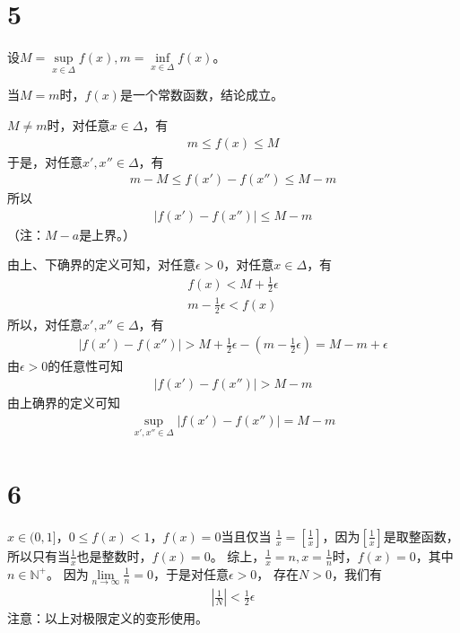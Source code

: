 \documentclass{article}
\begin{document}
\section*{5}

设$M = \sup\limits_{x \in \Delta} f(x), m = \inf\limits_{x \in \Delta} f(x)$。

当$M = m$时，$f(x)$是一个常数函数，结论成立。

$M \neq m$时，对任意$x \in \Delta$，有
\begin{align*}
  m \leq f(x) \leq M
\end{align*}
于是，对任意$x', x'' \in \Delta$，有
\begin{align*}
  m - M \leq f(x') - f(x'') \leq M - m
\end{align*}
所以
\begin{align*}
  |f(x') - f(x'')| \leq M - m
\end{align*}
（注：$M - a$是上界。）

由上、下确界的定义可知，对任意$\epsilon > 0$，对任意$x \in \Delta$，有
\begin{align*}
  f(x) < M + \frac{1}{2}\epsilon \\
  m - \frac{1}{2}\epsilon < f(x)
\end{align*}
所以，对任意$x', x'' \in \Delta$，有
\begin{align*}
  |f(x') - f(x'')| > M + \frac{1}{2}\epsilon - (m - \frac{1}{2}\epsilon) = M - m + \epsilon
\end{align*}
由$\epsilon > 0$的任意性可知
\begin{align*}
  |f(x') - f(x'')| > M - m
\end{align*}
由上确界的定义可知
\begin{align*}
  \sup \limits_{x', x'' \in \Delta} |f(x') - f(x'')| = M - m
\end{align*}

\section*{6}

$x \in (0, 1]$，$0 \leq f(x) < 1$，$f(x) = 0$当且仅当
$\frac{1}{x} = [\frac{1}{x}]$，因为$[\frac{1}{x}]$是取整函数，
所以只有当$\frac{1}{x}$也是整数时，$f(x) = 0$。
综上，$\frac{1}{x} = n, x = \frac{1}{n}$时，$f(x) = 0$，其中$n \in \mathbb{N}^+$。
因为$\lim \limits_{n \to \infty} \frac{1}{n} = 0$，于是对任意$\epsilon > 0$，
存在$N > 0$，我们有
\begin{align*}
  |\frac{1}{N}| < \frac{1}{2}\epsilon
\end{align*}
注意：以上对极限定义的变形使用。
\end{document}
